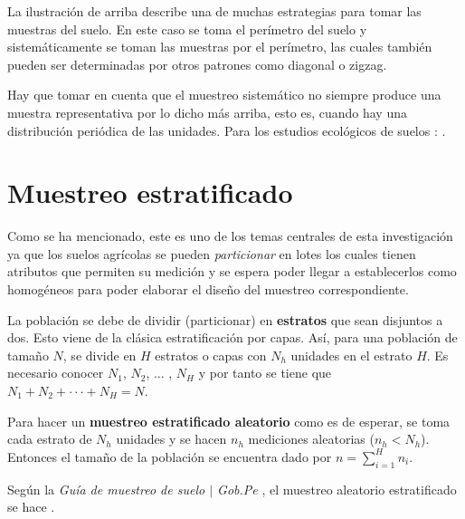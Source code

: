 \documentclass{report}
\begin{document}
La ilustración de arriba describe una de muchas estrategias \cite{lassaga-2011} \cite{gobpe-ministerio-del-ambiente-2014} para tomar las muestras del suelo. En este caso se toma el perímetro del suelo y sistemáticamente se toman las muestras por el perímetro, las cuales también pueden ser determinadas por otros patrones como diagonal o zigzag.

\bigbreak

Hay que tomar en cuenta que el muestreo sistemático no siempre produce una muestra representativa por lo dicho más arriba, esto es, cuando hay una distribución periódica de las unidades. Para los estudios ecológicos de suelos \cite{lohr-2009}: .

\section{Muestreo estratificado}

Como se ha mencionado, este es uno de los temas centrales de esta investigación ya que los suelos agrícolas se pueden \textit{particionar} en lotes los cuales tienen atributos que permiten su medición y se espera poder llegar a establecerlos como homogéneos para poder elaborar el diseño del muestreo correspondiente.

\bigbreak

La población se debe de dividir (particionar) en \textbf{estratos} que sean disjuntos a dos. Esto viene de la clásica estratificación por capas. Así, para una población de tamaño $N$, se divide en $H$ estratos o capas con $N_h$ unidades en el estrato $H$. Es necesario conocer $N_1$, $N_2$, ... , $N_H$ y por tanto se tiene que $N_1 + N_2 + \cdot \cdot \cdot + N_H = N$.

\bigbreak

Para hacer un \textbf{muestreo estratificado aleatorio} como es de esperar, se toma cada estrato de $N_h$ unidades y se hacen $n_h$ mediciones aleatorias ($n_h < N_h$). Entonces el tamaño de la población se encuentra dado por $n = \sum_{i=1}^H n_i$.

\bigbreak

Según la \textit{Guía de muestreo de suelo $\mid$ Gob.Pe} \cite{gobpe-ministerio-del-ambiente-2014}, el muestreo aleatorio estratificado se hace .
\end{document}
